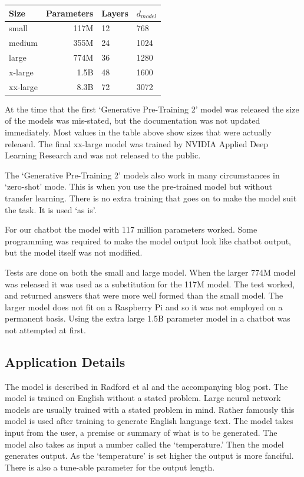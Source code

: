 \begin{center}

\begin{tabular}{lrll}
	Size & Parameters & Layers & $d_{model}$ \\
	\hline
	small & 117M       & 12     & 768          \\
	medium & 355M       & 24     & 1024         \\
	large & 774M       & 36     & 1280         \\
	x-large & 1.5B     & 48     & 1600 \\
	xx-large & 8.3B   &  72 &   3072 
\end{tabular}

	
\end{center}

At the time that the first `Generative Pre-Training 2' model was released the size of the models was mis-stated, but the documentation was not updated immediately. Most values in the table above show sizes that were actually released. The final xx-large model was trained by NVIDIA Applied Deep Learning Research \cite{2019NVIDIAadlr} and was not released to the public.

The `Generative Pre-Training 2' models also work in many circumstances in `zero-shot' mode. This is when you use the pre-trained model but without transfer learning. There is no extra training that goes on to make the model suit the task. It is used `as is'.

For our chatbot the model with 117 million parameters worked. Some programming was required to make the model output look like chatbot output, but the model itself was not modified.

Tests are done on both the small and large model. When the larger 774M model was released it was used as a substitution for the 117M model. The test worked, and returned answers that were more well formed than the small model. The larger model does not fit on a Raspberry Pi and so it was not employed on a permanent basis. Using the extra large 1.5B parameter model in a chatbot was not attempted at first.

\subsection{Application Details}
The model is described in Radford et al \cite{radford2019language} and the accompanying blog post. The model is trained on English without a stated problem. Large neural network models are usually trained with a stated problem in mind. Rather famously this model is used after training to generate English language text. The model takes input from the user, a premise or summary of what is to be generated. The model also takes as input a number called the `temperature.' Then the model generates output. As the `temperature' is set higher the output is more fanciful. There is also a tune-able parameter for the output length. 

